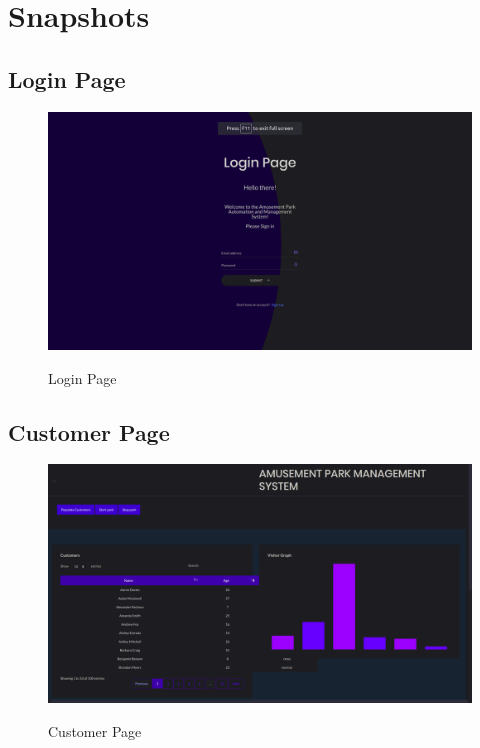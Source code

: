 \chapter{Snapshots}

\section{Login Page}
\begin{figure}[H]
\caption{Login Page}
\includegraphics[scale=.22]{./lgn.png}
\\[0.2in]
\label{fig:Login Page}
\end{figure}

\thispagestyle{fancy}


\section{Customer Page}
\begin{figure}[H]
\caption{Customer Page}
\includegraphics[scale=.22]{./cst.png}
\\[0.2in]
\label{fig:Customer Page}
\end{figure}

